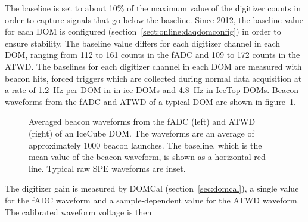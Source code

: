 The baseline is set to about 10\% of the maximum value of the
digitizer counts in
order to capture signals that go below the baseline. Since 2012, the
baseline value for each DOM is configured (section~\ref{sect:online:daqdomconfig}) in order to ensure 
stability. The baseline value differs for each digitizer channel in
each DOM, ranging from 112 to 161 counts in the fADC and 109 to 172
counts in the ATWD. The baselines for each digitizer channel in each DOM are measured with
beacon hits, forced triggers which are collected during normal data
acquisition at a rate of 1.2~Hz per DOM
in in-ice DOMs and 4.8~Hz in IceTop DOMs. Beacon waveforms
from the fADC and ATWD of a typical DOM are shown in figure~\ref{fig:raw_baselines}.

\begin{figure}[!h]
  \captionsetup[subfigure]{labelformat=empty}
  \centering
  \caption{Averaged beacon waveforms from the fADC (left) and ATWD (right) of
    an IceCube DOM. The waveforms are an average of approximately $1000$ beacon
   launches. The baseline, which is the mean value of the
    beacon waveform, is shown as a horizontal red line. Typical raw SPE
    waveforms are inset.}
  \label{fig:raw_baselines}
\end{figure}

The digitizer gain is measured by DOMCal (section~\ref{sec:domcal}), a single
value for the fADC waveform and a sample-dependent value for the ATWD
waveform. The calibrated waveform voltage is then

